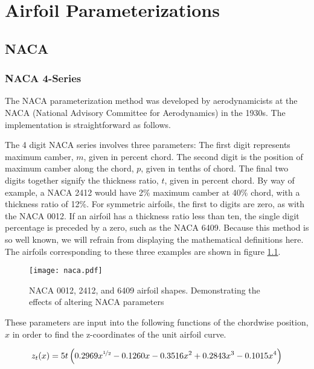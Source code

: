 



	
	\chapter{Airfoil Parameterizations}
	\label{ch:airfoilparams}
	

\section{NACA}
\subsection{NACA 4-Series}
The NACA parameterization method was developed by aerodynamicists at the NACA (National Advisory Committee for Aerodynamics) in the 1930s. \cite{Jacobs1933} The implementation is straightforward as follows.

The 4 digit NACA series involves three parameters: The first digit represents maximum camber, $m$, given in percent chord.  The second digit is the position of maximum camber along the chord, $p$, given in tenths of chord. The final two digits together signify the thickness ratio, $t$, given in percent chord.  By way of example, a NACA 2412 would have 2\% maximum camber at 40\% chord, with a thickness ratio of 12\%. For symmetric airfoils, the first to digits are zero, as with the NACA 0012.  If an airfoil has a thickness ratio less than ten, the single digit percentage is preceded by a zero, such as the NACA 6409.  Because this method is so well known, we will refrain from displaying the mathematical definitions here.
The airfoils corresponding to these three examples are shown in figure \ref{fig:nacas}.

\begin{figure}[h!]
	\begin{center}
		\texttt{[image: naca.pdf]}
	\end{center}
	\caption{NACA 0012, 2412, and 6409 airfoil shapes. Demonstrating the effects of altering NACA parameters}
	\label{fig:nacas}
\end{figure}

These parameters are input into the following functions of the chordwise position, $x$ in order to find the z-coordinates of the unit airfoil curve.

\begin{equation}
z_t(x) = 5t\left( 0.2969 x^{\nicefrac{1}{2}} - 0.1260 x - 0.3516x^2 +0.2843 x^3 - 0.1015 x^4  \right)
\end{equation}

